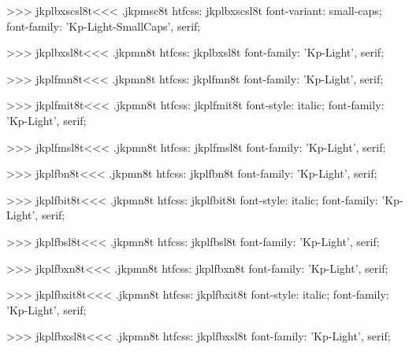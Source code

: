 >>>
\<jkplbxscsl8t\><<<
.jkpmsc8t
htfcss:  jkplbxscsl8t  font-variant: small-caps; font-family: 'Kp-Light-SmallCaps', serif;

>>>
\<jkplbxsl8t\><<<
.jkpmn8t
htfcss:  jkplbxsl8t  font-family: 'Kp-Light', serif;

>>>
\<jkplfmn8t\><<<
.jkpmn8t
htfcss:  jkplfmn8t  font-family: 'Kp-Light', serif;

>>>
\<jkplfmit8t\><<<
.jkpmn8t
htfcss:  jkplfmit8t  font-style: italic; font-family: 'Kp-Light', serif;

>>>
\<jkplfmsl8t\><<<
.jkpmn8t
htfcss:  jkplfmsl8t  font-family: 'Kp-Light', serif;

>>>
\<jkplfbn8t\><<<
.jkpmn8t
htfcss:  jkplfbn8t  font-family: 'Kp-Light', serif;

>>>
\<jkplfbit8t\><<<
.jkpmn8t
htfcss:  jkplfbit8t  font-style: italic; font-family: 'Kp-Light', serif;

>>>
\<jkplfbsl8t\><<<
.jkpmn8t
htfcss:  jkplfbsl8t  font-family: 'Kp-Light', serif;

>>>
\<jkplfbxn8t\><<<
.jkpmn8t
htfcss:  jkplfbxn8t  font-family: 'Kp-Light', serif;

>>>
\<jkplfbxit8t\><<<
.jkpmn8t
htfcss:  jkplfbxit8t  font-style: italic; font-family: 'Kp-Light', serif;

>>>
\<jkplfbxsl8t\><<<
.jkpmn8t
htfcss:  jkplfbxsl8t  font-family: 'Kp-Light', serif;

